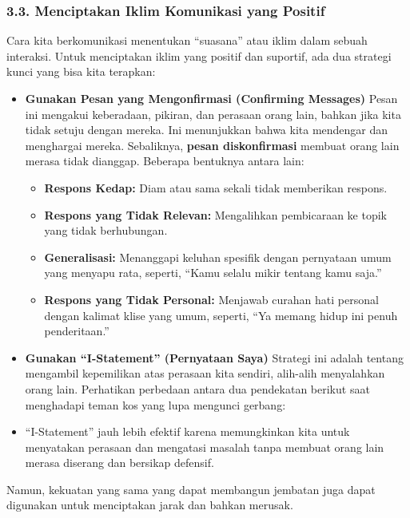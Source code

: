 \documentclass[
  letterpaper,
  DIV=11,
  numbers=noendperiod]{scrreprt}
\begin{document}
\subsubsection{3.3. Menciptakan Iklim Komunikasi yang
Positif}\label{menciptakan-iklim-komunikasi-yang-positif}

Cara kita berkomunikasi menentukan ``suasana'' atau iklim dalam sebuah
interaksi. Untuk menciptakan iklim yang positif dan suportif, ada dua
strategi kunci yang bisa kita terapkan:

\begin{itemize}
\item
  \textbf{Gunakan Pesan yang Mengonfirmasi (Confirming Messages)} Pesan
  ini mengakui keberadaan, pikiran, dan perasaan orang lain, bahkan jika
  kita tidak setuju dengan mereka. Ini menunjukkan bahwa kita mendengar
  dan menghargai mereka. Sebaliknya, \textbf{pesan diskonfirmasi}
  membuat orang lain merasa tidak dianggap. Beberapa bentuknya antara
  lain:

  \begin{itemize}
  \item
    \textbf{Respons Kedap:} Diam atau sama sekali tidak memberikan
    respons.
  \item
    \textbf{Respons yang Tidak Relevan:} Mengalihkan pembicaraan ke
    topik yang tidak berhubungan.
  \item
    \textbf{Generalisasi:} Menanggapi keluhan spesifik dengan pernyataan
    umum yang menyapu rata, seperti, ``Kamu selalu mikir tentang kamu
    saja.''
  \item
    \textbf{Respons yang Tidak Personal:} Menjawab curahan hati personal
    dengan kalimat klise yang umum, seperti, ``Ya memang hidup ini penuh
    penderitaan.''
  \end{itemize}
\item
  \textbf{Gunakan ``I-Statement'' (Pernyataan Saya)} Strategi ini adalah
  tentang mengambil kepemilikan atas perasaan kita sendiri, alih-alih
  menyalahkan orang lain. Perhatikan perbedaan antara dua pendekatan
  berikut saat menghadapi teman kos yang lupa mengunci gerbang:
\item
  ``I-Statement'' jauh lebih efektif karena memungkinkan kita untuk
  menyatakan perasaan dan mengatasi masalah tanpa membuat orang lain
  merasa diserang dan bersikap defensif.
\end{itemize}

Namun, kekuatan yang sama yang dapat membangun jembatan juga dapat
digunakan untuk menciptakan jarak dan bahkan merusak.
\end{document}
